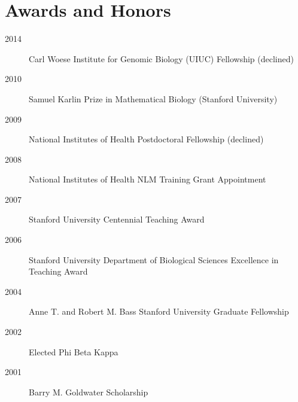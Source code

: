 \documentclass[11pt]{article}
\begin{document}
  \section{Awards and Honors}

  \begin{description}
  \item[2014] Carl Woese Institute for Genomic Biology (UIUC) Fellowship (declined)
  \item[2010] Samuel Karlin Prize in Mathematical Biology (Stanford University) 
  \item[2009] National Institutes of Health Postdoctoral Fellowship (declined)
  \item[2008] National Institutes of Health NLM Training Grant Appointment
  \item[2007] Stanford University Centennial Teaching Award
  \item[2006] Stanford University Department of Biological Sciences Excellence in Teaching Award
  \item[2004] Anne T. and Robert M. Bass Stanford University Graduate Fellowship
  \item[2002] Elected Phi Beta Kappa
  \item[2001] Barry M. Goldwater Scholarship
  \end{description}
  
\end{document}
